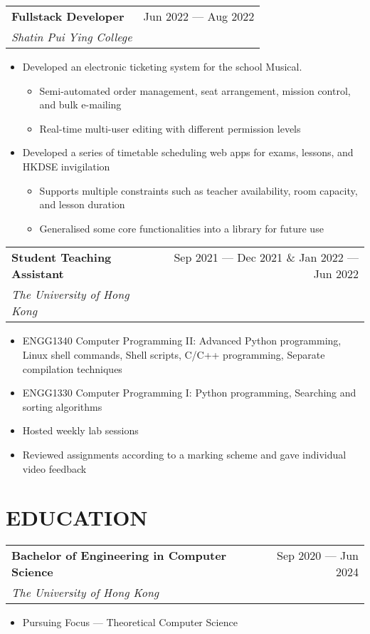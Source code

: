 \documentclass{article}
\newcommand{\jobTitle}[3]{
\vspace{0.4cm}
\begin{tabularx}{0.99\linewidth}{ X r }
    \textbf{#1} & #2\\
    \textit{#3} &
\end{tabularx}
\vspace{0.2cm}
}
\newenvironment{descitemize}
{ \begin{itemize}[leftmargin=1.4cm,,topsep=0pt]
    \setlength{\parskip}{0pt}
    \setlength{\parsep}{0pt}     }
{ \end{itemize}                  }
\begin{document}
\jobTitle
{Fullstack Developer}
{Jun 2022 --- Aug 2022}
{Shatin Pui Ying College}
\begin{descitemize}
    \item Developed an electronic ticketing system for the school Musical.
    \begin{itemize}
        \item Semi-automated order management, seat arrangement, mission control, and bulk e-mailing
        \item Real-time multi-user editing with different permission levels
    \end{itemize}
    \item Developed a series of timetable scheduling web apps for exams, lessons, and HKDSE invigilation
    \begin{itemize}
        \item Supports multiple constraints such as teacher availability, room capacity, and lesson duration
        \item Generalised some core functionalities into a library for future use
    \end{itemize}
\end{descitemize}

\jobTitle
{Student Teaching Assistant}
{Sep 2021 --- Dec 2021 \& Jan 2022 --- Jun 2022}
{The University of Hong Kong}
\begin{descitemize}
    \item ENGG1340 Computer Programming II: Advanced Python programming, Linux shell commands, Shell scripts, C/C++ programming, Separate compilation techniques
    \item ENGG1330 Computer Programming I: Python programming, Searching and sorting algorithms
    \item Hosted weekly lab sessions
    \item Reviewed assignments according to a marking scheme and gave individual video feedback
\end{descitemize}

\section{EDUCATION}

\jobTitle
{Bachelor of Engineering in Computer Science}
{Sep 2020 --- Jun 2024}
{The University of Hong Kong}
\begin{descitemize}
    \item Pursuing Focus --- Theoretical Computer Science
\end{descitemize}
\end{document}
